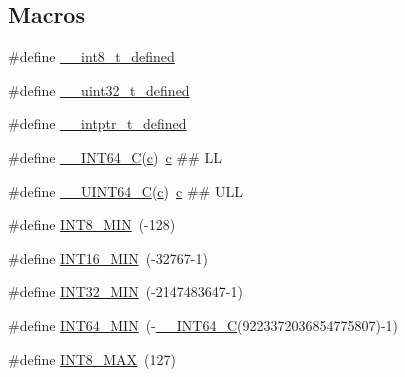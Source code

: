 \subsection*{Macros}
\begin{DoxyCompactItemize}
\item 
\#define \hyperlink{win_2_l_a_d_s_p_a__plugins-win_2glibc__includes_2stdint_8h_a78fdf69334f7a77246a8a97367b65197}{\+\_\+\+\_\+int8\+\_\+t\+\_\+defined}
\item 
\#define \hyperlink{win_2_l_a_d_s_p_a__plugins-win_2glibc__includes_2stdint_8h_aa61364f4bd1bff450a30484f6a124aa7}{\+\_\+\+\_\+uint32\+\_\+t\+\_\+defined}
\item 
\#define \hyperlink{win_2_l_a_d_s_p_a__plugins-win_2glibc__includes_2stdint_8h_a2c0051da1f3ebc4e4419f733a2d6f56d}{\+\_\+\+\_\+intptr\+\_\+t\+\_\+defined}
\item 
\#define \hyperlink{win_2_l_a_d_s_p_a__plugins-win_2glibc__includes_2stdint_8h_a4b8971e411b88166747d2a3c2425eaee}{\+\_\+\+\_\+\+I\+N\+T64\+\_\+C}(\hyperlink{rfft2d_test_m_l_8m_ae0323a9039add2978bf5b49550572c7c}{c})~\hyperlink{rfft2d_test_m_l_8m_ae0323a9039add2978bf5b49550572c7c}{c} \#\# LL
\item 
\#define \hyperlink{win_2_l_a_d_s_p_a__plugins-win_2glibc__includes_2stdint_8h_a405cee4934ed56c9a4aa4e7dc4380bd2}{\+\_\+\+\_\+\+U\+I\+N\+T64\+\_\+C}(\hyperlink{rfft2d_test_m_l_8m_ae0323a9039add2978bf5b49550572c7c}{c})~\hyperlink{rfft2d_test_m_l_8m_ae0323a9039add2978bf5b49550572c7c}{c} \#\# U\+LL
\item 
\#define \hyperlink{win_2_l_a_d_s_p_a__plugins-win_2glibc__includes_2stdint_8h_aadcf2a81af243df333b31efa6461ab8e}{I\+N\+T8\+\_\+\+M\+IN}~(-\/128)
\item 
\#define \hyperlink{win_2_l_a_d_s_p_a__plugins-win_2glibc__includes_2stdint_8h_ad4e9955955b27624963643eac448118a}{I\+N\+T16\+\_\+\+M\+IN}~(-\/32767-\/1)
\item 
\#define \hyperlink{win_2_l_a_d_s_p_a__plugins-win_2glibc__includes_2stdint_8h_a688eb21a22db27c2b2bd5836943cdcbe}{I\+N\+T32\+\_\+\+M\+IN}~(-\/2147483647-\/1)
\item 
\#define \hyperlink{win_2_l_a_d_s_p_a__plugins-win_2glibc__includes_2stdint_8h_ab21f12f372f67b8ff0aa3432336ede67}{I\+N\+T64\+\_\+\+M\+IN}~(-\/\hyperlink{win_2_l_a_d_s_p_a__plugins-win_2glibc__includes_2stdint_8h_a4b8971e411b88166747d2a3c2425eaee}{\+\_\+\+\_\+\+I\+N\+T64\+\_\+C}(9223372036854775807)-\/1)
\item 
\#define \hyperlink{win_2_l_a_d_s_p_a__plugins-win_2glibc__includes_2stdint_8h_aaf7f29f45f1a513b4748a4e5014ddf6a}{I\+N\+T8\+\_\+\+M\+AX}~(127)

\end{DoxyCompactItemize}
